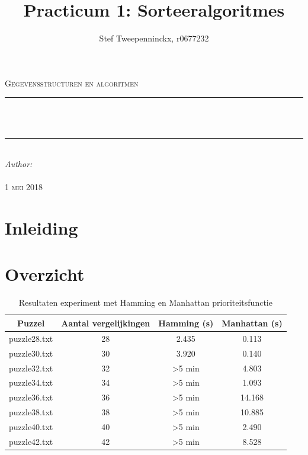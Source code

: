 \documentclass[11pt, a4paper]{article}
\author{Stef Tweepenninckx, r0677232}
\title{Practicum 1: Sorteeralgoritmes}
\makeatletter
\def\printtitle{                 
    {\large \@title}}
\def\printauthor{                  
    {\large \@author}}
\makeatother
\begin{document}
\begin{titlepage}
\newcommand{\HRule}{\rule{\linewidth}{0.5mm}} 
\center 
\textsc{\LARGE Gegevensstructuren en algoritmen}\\[1.5cm] 
\HRule \\[0.4cm]

{\huge \bfseries \printtitle}\\[0.4cm] 
\HRule \\[0.4cm]

\Large \emph{Author:}\\
 \textsc{\printauthor}\\[3cm]

{\large \textsc{1 mei 2018}}\\[3cm] 

\vfill 
\end{titlepage}

\section*{Inleiding}

\section*{Overzicht}
\begin{table}[ht]
\centering
\label{my-label}
\begin{tabular}{|cccc|}
\hline
Puzzel       & Aantal vergelijkingen & Hamming (s)        & Manhattan (s) \\ \hline
puzzle28.txt & 28                    & 2.435              & 0.113         \\
puzzle30.txt & 30                    & 3.920              & 0.140         \\
puzzle32.txt & 32                    & \textgreater 5 min & 4.803         \\
puzzle34.txt & 34                    & \textgreater 5 min & 1.093         \\
puzzle36.txt & 36                    & \textgreater 5 min & 14.168        \\
puzzle38.txt & 38                    & \textgreater 5 min & 10.885        \\
puzzle40.txt & 40                    & \textgreater 5 min & 2.490         \\
puzzle42.txt & 42                    & \textgreater 5 min & 8.528         \\ \hline
\end{tabular}
\captionsetup{justification=centering,margin=2cm}
\caption{Resultaten experiment met Hamming en Manhattan prioriteitsfunctie}
\end{table}
\end{document}
